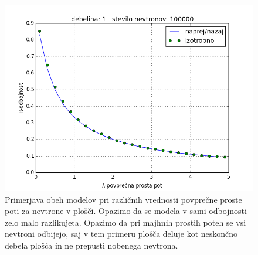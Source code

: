 \documentclass[slovene,11pt,a4paper]{article}
\numberwithin{equation}{section} %
\numberwithin{figure}{section} %
\numberwithin{table}{section} %
\begin{document}
\begin{figure}[t]
\begin{center}
\includegraphics[scale=0.65]{slike/9_3_lamda.png}
\caption{Primerjava obeh modelov pri različnih vrednosti povprečne proste poti za nevtrone v plošči. Opazimo da se modela v sami odbojnosti zelo malo razlikujeta. Opazimo da pri majhnih prostih poteh se vsi nevtroni odbijejo, saj v tem primeru plošča deluje kot neskončno debela plošča in ne prepusti nobenega nevtrona.}
\end{center}
\end{figure}



\pagebreak
\end{document}
